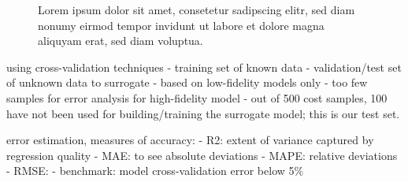 \begin{figure}
    \noindent{}
    \noindent{}
    \caption{Lorem ipsum dolor sit amet, consetetur sadipscing elitr, sed diam nonumy eirmod tempor invidunt ut labore et dolore magna aliquyam erat, sed diam voluptua.}
    \label{fig:error}
\end{figure}

using cross-validation techniques 
- training set of known data
- validation/test set of unknown data to surrogate \cite{gratiet_metamodel-based_2015}
- based on low-fidelity models only
- too few samples for error analysis for high-fidelity model
- out of 500 cost samples, 100 have not been used for building/training the surrogate model; this is our test set.

error estimation, measures of accuracy:
- R2: extent of variance captured by regression quality
- MAE: to see absolute deviations
- MAPE: relative deviations
- RMSE:
- benchmark: model cross-validation error below 5\% \cite{trondle_trade-offs_2020}

